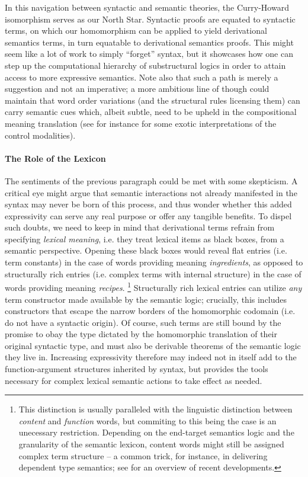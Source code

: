 In this navigation between syntactic and semantic theories, the Curry-\linebreak Howard isomorphism serves as our North Star.
Syntactic proofs are equated to syntactic terms, on which our homomorphism can be applied to yield derivational semantics terms, in turn equatable to derivational semantics proofs.
This might seem like a lot of work to simply ``forget'' syntax, but it showcases how one can step up the computational hierarchy of substructural logics in order to attain access to more expressive semantics.
Note also that such a path is merely a suggestion and not an imperative; a more ambitious line of though could maintain that word order variations (and the structural rules licensing them) can carry semantic cues which, albeit subtle, need to be upheld in the compositional meaning translation (see for instance \citet{duarte2022quantum} for some exotic interpretations of the control modalities).

\paragraph{The Role of the Lexicon}
The sentiments of the previous paragraph could be met with some skepticism.
A critical eye might argue that semantic interactions not already manifested in the syntax may never be born of this process, and thus wonder whether this added expressivity can serve any real purpose or offer any tangible benefits.
To dispel such doubts, we need to keep in mind that derivational terms refrain from specifying \textit{lexical meaning}, i.e. they treat lexical items as black boxes, from a semantic perspective.
Opening these black boxes would reveal flat entries (i.e. term constants) in the case of words providing meaning \textit{ingredients}, as opposed to structurally rich entries (i.e. complex terms with internal structure) in the case of words providing meaning \textit{recipes}.%
\footnote{This distinction is usually paralleled with the linguistic distinction between \textit{content} and \textit{function} words, but commiting to this being the case is an unecessary restriction. Depending on the end-target semantics logic and the granularity of the semantic lexicon, content words might still be assigned complex term structure -- a common trick, for instance, in delivering dependent type semantics; see \citet{chatzikyriakidis2020formal} for an overview of recent developments.}
Structurally rich lexical entries can utilize \textit{any} term constructor made available by the semantic logic; crucially, this includes constructors that escape the narrow borders of the homomorphic codomain (i.e. do not have a syntactic origin).
Of course, such terms are still bound by the promise to obay the type dictated by the homomorphic translation of their original syntactic type, and must also be derivable theorems of the semantic logic they live in.
Increasing expressivity therefore may indeed not in itself add to the function-argument structures inherited by syntax, but provides the tools necessary for complex lexical semantic actions to take effect as needed.

